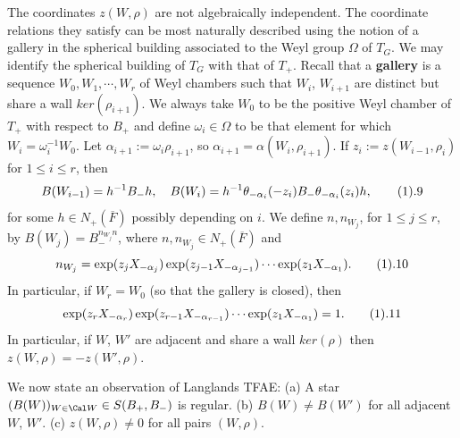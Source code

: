 The coordinates $z(W,\rho)$ are not algebraically independent.
The coordinate relations they satisfy can be most naturally
described using the notion of a gallery in the spherical building 
associated to the Weyl group $\Omega$ of $T_G$. We may identify the
spherical building of $T_G$ with that of $T_+$.
Recall that a {\bf gallery} is a sequence $W_0,W_1,\cdots, W_r$
of Weyl chambers such that $W_i$, $W_{i+1}$ are distinct but share a wall
$ker(\rho_{i+1})$. We always take $W_0$ to be the positive Weyl chamber of
$T_+$ with respect to $B_+$ and define
$\omega_i\in\Omega$ to be that element for which
$W_i=\omega_i^{-1}W_0$. Let $\alpha_{i+1}:=\omega_i\rho_{i+1}$,
so $\alpha_{i+1}=\alpha(W_i,\rho_{i+1})$. If $z_i:=z(W_{i-1},\rho_i)$
for $1\leq i\leq r$,
then
$$
B(W_{i-1})=h^{-1}B_-h,\ \ \ 
B(W_i)=h^{-1}\theta_{-\alpha_i}(-z_i)
B_-\theta_{-\alpha_i}(z_i)h,
\tag 1.9
$$
for some $h\in N_+(\overline{F})$ possibly depending on $i$. We
define $n,n_{W_j}$, for $1\leq j\leq r$, by
$B(W_j)=B_-^{n_{W_j}n}$, where $n,n_{W_j}\in N_+(\overline{F})$
and
$$
n_{W_j}=\exp (z_jX_{-\alpha_j})
\exp (z_{j-1}X_{-\alpha_{j-1}})\cdots \exp (z_1X_{-\alpha_1}).
\tag 1.10
$$
In particular, if $W_r=W_0$ (so that the gallery is closed),
then
$$
\exp (z_rX_{-\alpha_r})
\exp (z_{r-1}X_{-\alpha_{r-1}})\cdots \exp (z_1X_{-\alpha_1})=1.
\tag 1.11
$$
In particular, if $W$, $W'$ are adjacent and share a wall
$ker(\rho)$ then $z(W,\rho)=-z(W',\rho)$.
\par
We now state an observation of Langlands \cite{L, pp.483-484}
 TFAE:
\newline
(a) A star $(B(W))_{W\in{\Cal W}}\in S(B_+,B_-)$ is regular.
\newline
(b) $B(W)\not= B(W')$ for all adjacent $W$, $W'$.
\newline
(c) $z(W,\rho)\not= 0$ for all pairs $(W,\rho)$.
 \endproclaim

